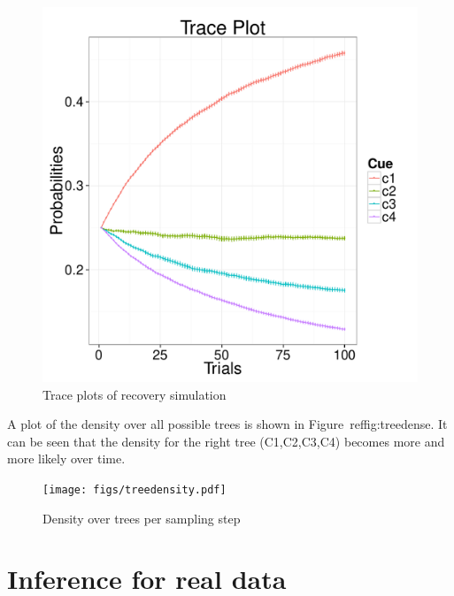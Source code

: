 \documentclass[a4paper,man, natbib]{apa6}
\begin{document}
\begin{figure}[htb!]
  \caption{Trace plots of recovery simulation}
\label{ttbrecover}
  \centering
    \includegraphics[scale=0.5]{figs/ttbrecovertrace.pdf}
\end{figure}

A plot of the density over all possible trees is shown in Figure~ref{fig:treedense}. It can be seen that the density for the right tree (C1,C2,C3,C4) becomes more and more likely over time.

\begin{figure}[htb!]
  \caption{Density over trees per sampling step}
\label{fig:treedense}
  \centering
    \texttt{[image: figs/treedensity.pdf]}
\end{figure}


\section{Inference for real data}
\end{document}
